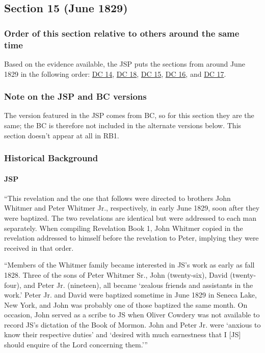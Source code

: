 \subsection{Section 15 (June 1829)}
	\label{DC15}
	
	\subsubsection{Order of this section relative to others around the same time}
	
		Based on the evidence available, the JSP puts the sections from around June 1829 in the following order: \hyperref[DC14]{DC 14}, \hyperref[DC18]{DC 18}, \hyperref[DC15]{DC 15}, \hyperref[DC16]{DC 16}, and \hyperref[DC17]{DC 17}.
	
	\subsubsection{Note on the JSP and BC versions}
	
		The version featured in the JSP comes from BC, so for this section they are the same; the BC is therefore not included in the alternate versions below. This section doesn't appear at all in RB1.
	
	\subsubsection{Historical Background}
		\label{DC15-HB}
		
		\paragraph{JSP}
		
			``This revelation and the one that follows were directed to brothers John Whitmer and Peter Whitmer Jr., respectively, in early June 1829, soon after they were baptized. The two revelations are identical but were addressed to each man separately. When compiling Revelation Book 1, John Whitmer copied in the revelation addressed to himself before the revelation to Peter, implying they were received in that order.
			
			``Members of the Whitmer family became interested in JS's work as early as fall 1828. Three of the sons of Peter Whitmer Sr., John (twenty-six), David (twenty-four), and Peter Jr. (nineteen), all became `zealous friends and assistants in the work.' Peter Jr. and David were baptized sometime in June 1829 in Seneca Lake, New York, and John was probably one of those baptized the same month. On occasion, John served as a scribe to JS when Oliver Cowdery was not available to record JS's dictation of the Book of Mormon. John and Peter Jr. were `anxious to know their respective duties' and `desired with much earnestness that I [JS] should enquire of the Lord concerning them.'''
			

